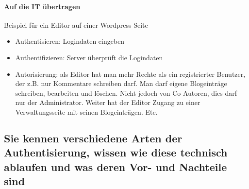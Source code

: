 \documentclass[10pt,a4paper]{article}
\begin{document}
\paragraph*{Auf die IT übertragen}Beispiel für ein Editor auf einer Wordpress Seite
\begin{itemize}[noitemsep,topsep=0pt,leftmargin=*]
    \item Authentisieren: Logindaten eingeben
    \item Authentifizieren: Server überprüft die Logindaten
    \item Autorisierung: als Editor hat man mehr Rechte als ein registrierter Benutzer, der z.B. nur Kommentare schreiben darf. Man darf eigene Blogeinträge schreiben, bearbeiten und löschen. Nicht jedoch von Co-Autoren, dies darf nur der Administrator. Weiter hat der Editor Zugang zu einer Verwaltungsseite mit seinen Blogeinträgen. Etc.
\end{itemize}

\subsection*{Sie kennen verschiedene Arten der Authentisierung, wissen wie diese technisch ablaufen und was deren Vor- und Nachteile sind}
\end{document}
